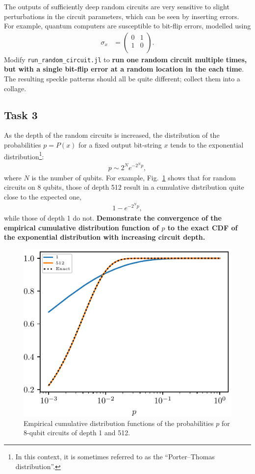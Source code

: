 \documentclass[12pt]{article}
\begin{document}
The outputs of sufficiently deep random circuits are very sensitive to slight perturbations in the circuit parameters, which can be seen by inserting errors.
For example, quantum computers are susceptible to bit-flip errors, modelled using
\begin{align}
	\sigma_x
	&= \begin{pmatrix}
			0 & 1 \\
			1 & 0 \\
		\end{pmatrix}.
\end{align}
Modify \texttt{run\_random\_circuit.jl} to \textbf{run one random circuit multiple times, but with a single bit-flip error at a random location in the each time}.
The resulting speckle patterns should all be quite different; collect them into a collage.


\subsection*{Task 3}

As the depth of the random circuits is increased, the distribution of the probabilities $p = P(x)$ for a fixed output bit-string $x$ tends to the exponential distribution\footnote{
	In this context, it is sometimes referred to as the ``Porter--Thomas distribution''.
}:
\begin{align}
	p \sim 2^N e^{-2^N p},
\end{align}
where $N$ is the number of qubits.
For example, Fig.~\ref{fig:dists} shows that for random circuits on 8 qubits, those of depth 512 result in a cumulative distribution quite close to the expected one,
\begin{align}
	1 - e^{-2^N p},
\end{align}
while those of depth 1 do not.
\textbf{Demonstrate the convergence of the empirical cumulative distribution function of $p$ to the exact CDF of the exponential distribution with increasing circuit depth.}

\begin{figure}
	\centering
	\includegraphics{dists_N=008}
	\caption{
		Empirical cumulative distribution functions of the probabilities $p$ for 8-qubit circuits of depth 1 and 512.
	}
	\label{fig:dists}
\end{figure}
\end{document}
